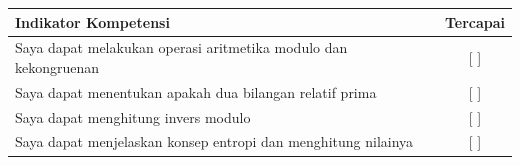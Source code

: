 \documentclass[../main.tex]{subfiles}
\begin{document}
\begin{competencychecklist}
\begin{tabularx}{\linewidth}{|X|c|}
\hline
Indikator Kompetensi & Tercapai \\
\hline
Saya dapat melakukan operasi aritmetika modulo dan kekongruenan & [ ] \\
\hline
Saya dapat menentukan apakah dua bilangan relatif prima & [ ] \\
\hline
Saya dapat menghitung invers modulo & [ ] \\
\hline
Saya dapat menjelaskan konsep entropi dan menghitung nilainya & [ ] \\
\hline
\end{tabularx}
\end{competencychecklist}
\end{document}
